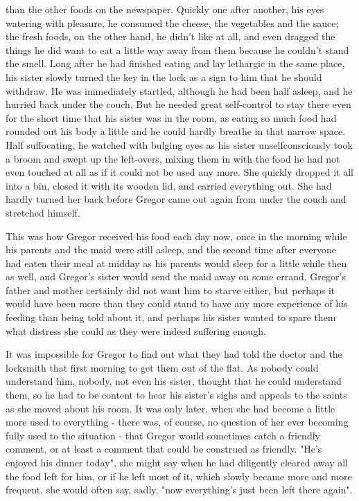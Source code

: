 \documentclass[12pt]{book}
\begin{document}
than the other foods on the newspaper. Quickly one after another, his eyes watering with pleasure, he consumed the cheese, the vegetables and the sauce; the fresh foods, on the other hand, he didn't like at all, and even dragged the things he did want to eat a little way away from them because he couldn't stand the smell. Long after he had finished eating and lay lethargic in the same place, his sister slowly turned the key in the lock as a sign to him that he should withdraw. He was immediately startled, although he had been half asleep, and he hurried back under the couch. But he needed great self-control to stay there even for the short time that his sister was in the room, as eating so much food had rounded out his body a little and he could hardly breathe in that narrow space. Half suffocating, he watched with bulging eyes as his sister unselfconsciously took a broom and swept up the left-overs, mixing them in with the food he had not even touched at all as if it could not be used any more. She quickly dropped it all into a bin, closed it with its wooden lid, and carried everything out. She had hardly turned her back before Gregor came out again from under the couch and stretched himself.

    This was how Gregor received his food each day now, once in the morning while his parents and the maid were still asleep, and the second time after everyone had eaten their meal at midday as his parents would sleep for a little while then as well, and Gregor's sister would send the maid away on some errand. Gregor's father and mother certainly did not want him to starve either, but perhaps it would have been more than they could stand to have any more experience of his feeding than being told about it, and perhaps his sister wanted to spare them what distress she could as they were indeed suffering enough.

    It was impossible for Gregor to find out what they had told the doctor and the locksmith that first morning to get them out of the flat. As nobody could understand him, nobody, not even his sister, thought that he could understand them, so he had to be content to hear his sister's sighs and appeals to the saints as she moved about his room. It was only later, when she had become a little more used to everything - there was, of course, no question of her ever becoming fully used to the situation - that Gregor would sometimes catch a friendly comment, or at least a comment that could be construed as friendly. "He's enjoyed his dinner today", she might say when he had diligently cleared away all the food left for him, or if he left most of it, which slowly became more and more frequent, she would often say, sadly, "now everything's just been left there again".
\end{document}
